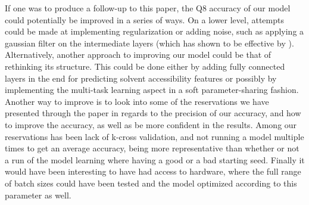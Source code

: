 If one was to produce a follow-up to this paper, the Q8 accuracy of our model could potentially be improved in a series of ways. On a lower level, attempts could be made at implementing regularization or adding noise, such as applying a gaussian filter on the intermediate layers (which has shown to be effective by \citeauthor{zhou-and-troyanskaya-2014}).\\
Alternatively, another approach to improving our model could be that of rethinking its structure. This could be done either by adding fully connected layers in the end for predicting solvent accessibility features or possibly by implementing the multi-task learning aspect in a soft parameter-sharing fashion. \\
Another way to improve is to look into some of the reservations we have presented through the paper in regards to the precision of our accuracy, and how to improve the accuracy, as well as be more confident in the results. Among our reservations has been lack of k-cross validation, and not running a model multiple times to get an average accuracy, being more representative than whether or not a run of the model learning where having a good or a bad starting seed. Finally it would have been interesting to have had access to hardware, where the full range of batch sizes could have been tested and the model optimized according to this parameter as well.